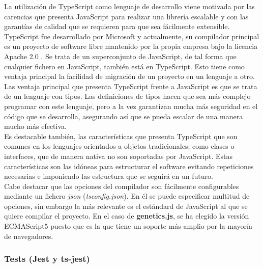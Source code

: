  La utilización de TypeScript como lenguaje de desarrollo viene motivada por las carencias que presenta JavaScript para realizar una librería escalable y con las garantías de calidad que se requieren para que sea fácilmente extensible. \\
 
 TypeScript fue desarrollado por Microsoft y actualmente, su compilador principal es un proyecto de software libre mantenido por la propia empresa bajo la licencia Apache 2.0 \cite{typescriptrepo}. Se trata de un superconjunto de JavaScript, de tal forma que cualquier fichero en JavaScript, también está en TypeScript. Esto tiene como ventaja principal la facilidad de migración de un proyecto en un lenguaje a otro. \\
 
 Las ventaja principal que presenta TypeScript frente a JavaScript es que se trata de un lenguaje con tipos. Las definiciones de tipos hacen que sea más complejo programar con este lenguaje, pero a la vez garantizan mucha más seguridad en el código que se desarrolla, asegurando así que se pueda escalar de una manera mucho más efectiva. \\
 
 Es destacable también, las características que presenta TypeScript que son comunes en los lenguajes orientados a objetos tradicionales; como clases o interfaces, que de manera nativa no son soportadas por JavaScript. Estas características son las idóneas para estructurar el software evitando repeticiones necesarias e imponiendo las estructura que se seguirá en un futuro. \\
 
 Cabe destacar que las opciones del compilador son fácilmente configurables mediante un fichero \textit{json} (\textit{tsconfig.json}). En él se puede especificar multitud de opciones, sin embargo la más relevante es el estándard de JavaScript al que se quiere compilar el proyecto. En el caso de \textbf{genetics.js}, se ha elegido la versión ECMAScript5 puesto que es la que tiene un soporte más amplio por la mayoría de navegadores.
 
\subsubsection{Tests (Jest y ts-jest)}


